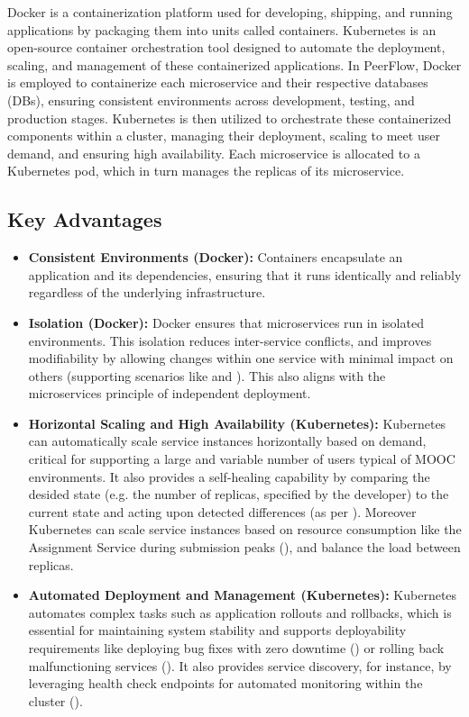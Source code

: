 \begin{justify}
Docker is a containerization platform used for developing, shipping, and running applications by packaging them into units called containers. Kubernetes is an open-source container orchestration tool designed to automate the deployment, scaling, and management of these containerized applications. In PeerFlow, Docker is employed to containerize each microservice and their respective databases (DBs), ensuring consistent environments across development, testing, and production stages. Kubernetes is then utilized to orchestrate these containerized components within a cluster, managing their deployment, scaling to meet user demand, and ensuring high availability. Each microservice is allocated to a Kubernetes pod, which in turn manages the replicas of its microservice.
\end{justify}

\subsection{Key Advantages}

\begin{itemize}
    \item \textbf{Consistent Environments (Docker):} Containers encapsulate an application and its dependencies, ensuring that it runs identically and reliably regardless of the underlying infrastructure.
    \item \textbf{Isolation (Docker):} Docker ensures that microservices run in isolated environments. This isolation reduces inter-service conflicts, and improves modifiability by allowing changes within one service with minimal impact on others (supporting scenarios like  and ). This also aligns with the microservices principle of independent deployment.
    \item \textbf{Horizontal Scaling and High Availability (Kubernetes):} Kubernetes can automatically scale service instances horizontally based on demand, critical for supporting a large and variable number of users typical of MOOC environments. It also provides a self-healing capability by comparing the desided state (e.g. the number of replicas, specified by the developer) to the current state and acting upon detected differences (as per ). Moreover Kubernetes can scale service instances based on resource consumption like the Assignment Service during submission peaks (), and balance the load between replicas.
    \item \textbf{Automated Deployment and Management (Kubernetes):} Kubernetes automates complex tasks such as application rollouts and rollbacks, which is essential for maintaining system stability and supports deployability requirements like deploying bug fixes with zero downtime () or rolling back malfunctioning services (). It also provides service discovery, for instance, by leveraging health check endpoints for automated monitoring within the cluster ().
\end{itemize}

